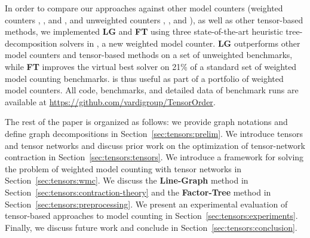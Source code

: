 In order to compare our approaches against other model counters (weighted counters  \cite{SBK05},  \cite{OD15}, and  \cite{LM17}, and unweighted counters  \cite{CW16},  \cite{FHMW17}, and  \cite{Thurley2006}), as well as other tensor-based methods, we implemented \textbf{LG} and \textbf{FT} using three state-of-the-art heuristic tree-decomposition solvers in , a new weighted model counter. \textbf{LG} outperforms other model counters and tensor-based methods on a set of unweighted benchmarks, while \textbf{FT} improves the virtual best solver on 21\% of a standard set of weighted model counting benchmarks.  is thus useful as part of a portfolio of weighted model counters. All code, benchmarks, and detailed data of benchmark runs are available at \newline \url{https://github.com/vardigroup/TensorOrder}.


The rest of the paper is organized as follows: we provide graph notations and define graph decompositions in Section~\ref{sec:tensors:prelim}. We introduce tensors and tensor networks and discuss prior work on the optimization of tensor-network contraction in Section~\ref{sec:tensors:tensors}. We introduce a framework for solving the problem of weighted model counting with tensor networks in Section~\ref{sec:tensors:wmc}. We discuss the \textbf{Line-Graph} method in Section~\ref{sec:tensors:contraction-theory} and the \textbf{Factor-Tree} method in Section~\ref{sec:tensors:preprocessing}. We present an experimental evaluation of tensor-based approaches to model counting in Section~\ref{sec:tensors:experiments}. Finally, we discuss future work and conclude in Section~\ref{sec:tensors:conclusion}.